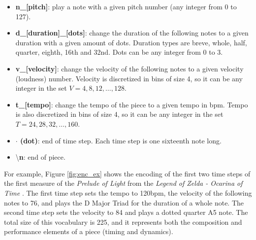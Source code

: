 \begin{itemize}
    \item \textbf{n\_[pitch]}: play a note with a given pitch number (any integer from 0 to 127).
    \item \textbf{d\_[duration]\_[dots]}: change the duration of the following notes to a given
    duration with a given amount of dots. Duration types are breve, whole, half, quarter,
    eighth, 16th and 32nd. Dots can be any integer from 0 to 3.
    \item \textbf{v\_[velocity]}: change the velocity of the following  notes to a given velocity (loudness) number. Velocity is discretized in
    bins of size 4, so it can be any integer in the set $V = {4, 8, 12, \dots, 128}$.
    \item \textbf{t\_[tempo]}: change the tempo of the piece to a given tempo in bpm. Tempo is also discretized in bins of size 4, so it can be any integer in the set $T = {24, 28, 32, \dots, 160}$.
    \item \textbf{$\cdot$ (dot)}: end of time step. Each time step is one sixteenth note long.
    \item \textbackslash \textbf{n}: end of piece.
\end{itemize}

For example, Figure \ref{fig:enc_ex} shows the encoding of the first two time steps of the first measure of the \textit{Prelude of Light} from the \textit{Legend of Zelda - Ocarina of Time} . The first time step sets the tempo to 120bpm, the velocity of the following notes to 76, and plays the D Major Triad for the duration of a whole note. The second time step sets the velocity to 84 and plays a dotted quarter A5 note. The total size of this vocabulary is 225, and it represents both the composition and performance elements of a piece (timing and dynamics).

